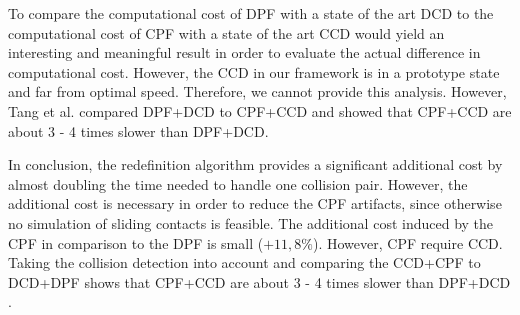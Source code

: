 To compare the computational cost of DPF with a state of the art DCD to the computational cost of CPF with a state of the art CCD would yield an interesting and meaningful result in order to evaluate the actual difference in computational cost. However, the CCD in our framework is in a prototype state and far from optimal speed. Therefore, we cannot provide this analysis. However, Tang et al. \cite{TANG2012} compared DPF+DCD to CPF+CCD and showed that CPF+CCD are about 3 - 4 times slower than DPF+DCD.

In conclusion, the redefinition algorithm provides a significant additional cost by almost doubling the time needed to handle one collision pair. However, the additional cost is necessary in order to reduce the CPF artifacts, since otherwise no simulation of sliding contacts is feasible. The additional cost induced by the CPF in comparison to the DPF is small ($+11,8 \%$). However, CPF require CCD. Taking the collision detection into account and comparing the CCD+CPF to DCD+DPF shows that CPF+CCD are about 3 - 4 times slower than DPF+DCD \cite{TANG2012}.